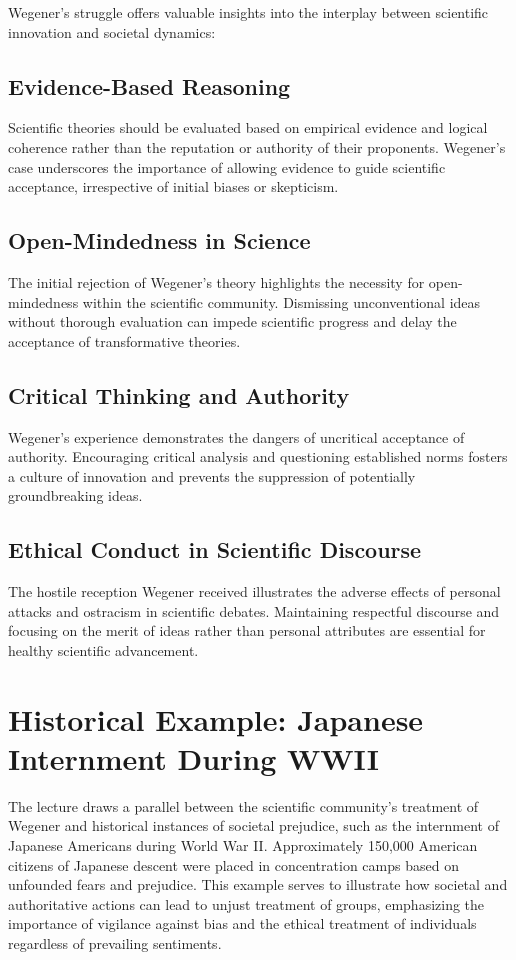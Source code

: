 \documentclass{article}
\begin{document}
Wegener's struggle offers valuable insights into the interplay between scientific innovation and societal dynamics:

\subsection{Evidence-Based Reasoning}

Scientific theories should be evaluated based on empirical evidence and logical coherence rather than the reputation or authority of their proponents. Wegener's case underscores the importance of allowing evidence to guide scientific acceptance, irrespective of initial biases or skepticism.

\subsection{Open-Mindedness in Science}

The initial rejection of Wegener's theory highlights the necessity for open-mindedness within the scientific community. Dismissing unconventional ideas without thorough evaluation can impede scientific progress and delay the acceptance of transformative theories.

\subsection{Critical Thinking and Authority}

Wegener's experience demonstrates the dangers of uncritical acceptance of authority. Encouraging critical analysis and questioning established norms fosters a culture of innovation and prevents the suppression of potentially groundbreaking ideas.

\subsection{Ethical Conduct in Scientific Discourse}

The hostile reception Wegener received illustrates the adverse effects of personal attacks and ostracism in scientific debates. Maintaining respectful discourse and focusing on the merit of ideas rather than personal attributes are essential for healthy scientific advancement.

\section{Historical Example: Japanese Internment During WWII}

The lecture draws a parallel between the scientific community's treatment of Wegener and historical instances of societal prejudice, such as the internment of Japanese Americans during World War II. Approximately 150,000 American citizens of Japanese descent were placed in concentration camps based on unfounded fears and prejudice. This example serves to illustrate how societal and authoritative actions can lead to unjust treatment of groups, emphasizing the importance of vigilance against bias and the ethical treatment of individuals regardless of prevailing sentiments.
\end{document}
